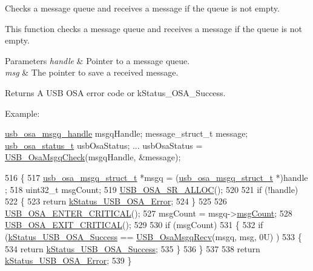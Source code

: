 Checks a message queue and receives a message if the queue is not empty. 

This function checks a message queue and receives a message if the queue is not empty.


\begin{DoxyParams}{Parameters}
{\em handle} & Pointer to a message queue. \\
\hline
{\em msg} & The pointer to save a received message.\\
\hline
\end{DoxyParams}
\begin{DoxyReturn}{Returns}
A U\-S\-B O\-S\-A error code or k\-Status\-\_\-\-O\-S\-A\-\_\-\-Success.
\end{DoxyReturn}
Example\-: 
\begin{DoxyCode}
\hyperlink{group__usb__os__abstraction_gab3a9f26ba50f3abea7fcbac07500cbb8}{usb\_osa\_msgq\_handle}      msgqHandle;
message\_struct\_t         message;
\hyperlink{group__usb__os__abstraction_ga8de2fb7579de0a6621bbc1776519b0a9}{usb\_osa\_status\_t}         usbOsaStatus;
...
usbOsaStatus = \hyperlink{group__usb__os__abstraction_ga734fbdd1bae936ba6758087ad2d9d862}{USB\_OsaMsgqCheck}(msgqHandle, &message);
\end{DoxyCode}
 
\begin{DoxyCode}
516 \{
517     \hyperlink{struct__usb__osa__msgq__struct}{usb\_osa\_msgq\_struct\_t} *msgq = (\hyperlink{struct__usb__osa__msgq__struct}{usb\_osa\_msgq\_struct\_t} *)handle
      ;
518     uint32\_t msgCount;
519     \hyperlink{usb__osa__bm_8h_a8dbccf46cc2f8e3b5cece6a4a84f7ae8}{USB\_OSA\_SR\_ALLOC}();
520 
521     \textcolor{keywordflow}{if} (!handle)
522     \{
523         \textcolor{keywordflow}{return} \hyperlink{group__usb__os__abstraction_gga453ebd2f93aafb8c938c3a23c815f9bda40b794ea06e27b8ec1d67538f12eb350}{kStatus\_USB\_OSA\_Error};
524     \}
525 
526     \hyperlink{usb__osa__bm_8h_a0485f70bf9c9a22f0340f014bc567362}{USB\_OSA\_ENTER\_CRITICAL}();
527     msgCount = msgq->\hyperlink{struct__usb__osa__msgq__struct_ad3256f6cde77697e233c64bff47ada29}{msgCount};
528     \hyperlink{usb__osa__bm_8h_a5b8053eca19b6df666a26fad3b07f953}{USB\_OSA\_EXIT\_CRITICAL}();
529 
530     \textcolor{keywordflow}{if} (msgCount)
531     \{
532         \textcolor{keywordflow}{if} (\hyperlink{group__usb__os__abstraction_gga453ebd2f93aafb8c938c3a23c815f9bdab90805fb75297fda1ca60dbb2283f933}{kStatus\_USB\_OSA\_Success} == \hyperlink{group__usb__os__abstraction_gaf2effe68aa0486c0823e253f78836d17}{USB\_OsaMsgqRecv}(msgq, msg, 0U)
      )
533         \{
534             \textcolor{keywordflow}{return} \hyperlink{group__usb__os__abstraction_gga453ebd2f93aafb8c938c3a23c815f9bdab90805fb75297fda1ca60dbb2283f933}{kStatus\_USB\_OSA\_Success};
535         \}
536     \}
537 
538     \textcolor{keywordflow}{return} \hyperlink{group__usb__os__abstraction_gga453ebd2f93aafb8c938c3a23c815f9bda40b794ea06e27b8ec1d67538f12eb350}{kStatus\_USB\_OSA\_Error};
539 \}
\end{DoxyCode}


